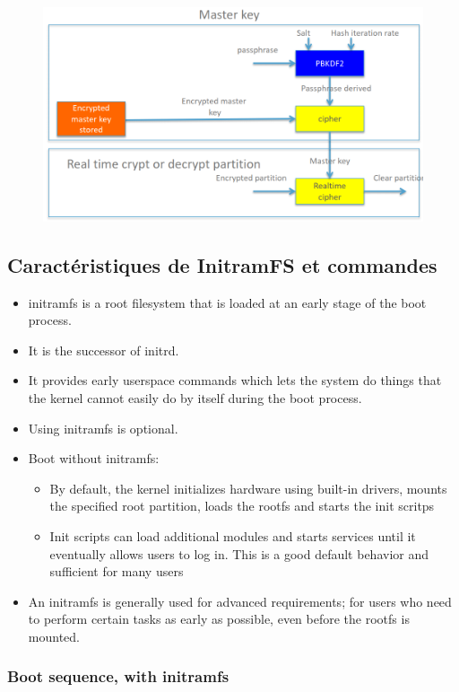 \documentclass[resume]{subfiles}
\begin{document}
\begin{figure}[H]
    \centering
    \includegraphics[width=0.75\columnwidth]{Figures/fileSystem/luksMastKey.png}
    \label{fig:luksMastKey}
\end{figure}

\subsection{Caractéristiques de InitramFS et commandes}

\begin{itemize}
\item initramfs is a root filesystem that is loaded at an early stage of the boot
process.
\item It is the successor of initrd.
\item It provides early userspace commands which lets the system do things that
the kernel cannot easily do by itself during the boot process.
\item Using initramfs is optional.
\item Boot without initramfs:
\begin{itemize}
\item By default, the kernel initializes hardware using built-in drivers, mounts the specified root partition, loads the rootfs and starts the init scritps
\item Init scripts can load additional modules and starts services until it eventually allows users to log in. This is a good default behavior and sufficient for many users
\end{itemize}
\item An initramfs is generally used for advanced requirements; for users who need to perform certain tasks as early as possible, even before the rootfs is mounted.
\end{itemize}

\subsubsection{Boot sequence, with initramfs}
\end{document}
